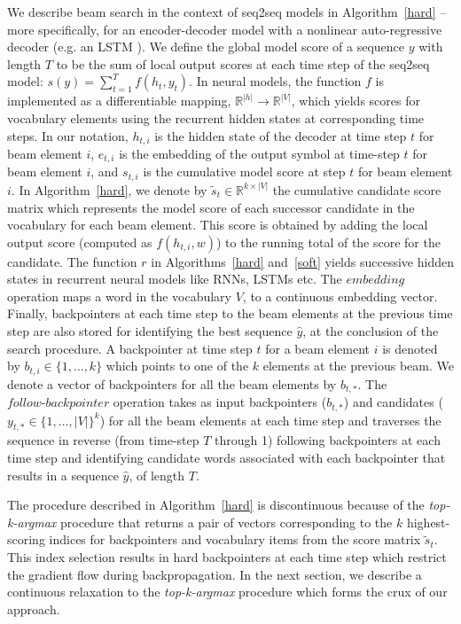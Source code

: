 \documentclass[letterpaper]{article} %
\begin{document}
We describe beam search in the context of seq2seq models in Algorithm~\ref{hard} -- more specifically, for an encoder-decoder \cite{sutskever2014sequence} model with a nonlinear auto-regressive decoder (e.g. an LSTM \cite{hochreiter1997long}). We define the global model score of a sequence $y$ with length $T$ to be the sum of local output scores at each time step of the seq2seq model: $s(y) = \sum_{t=1}^T f(h_t, y_t)$. In neural models, the function $f$ is implemented as a differentiable mapping, $\mathbb{R}^{|h|} \rightarrow \mathbb{R}^{|V|}$, which yields scores for vocabulary elements using the recurrent hidden states at corresponding time steps. In our notation, $h_{t,i}$ is the hidden state of the decoder at time step $t$ for beam element $i$, $e_{t,i}$ is the embedding of the output symbol at time-step $t$ for beam element $i$, and $s_{t,i}$ is the cumulative model score at step $t$ for beam element $i$. In Algorithm~\ref{hard}, we denote by $\tilde{s}_t \in \mathbb{R}^{k \times |V|}$ the cumulative candidate score matrix which represents the model score of each successor candidate in the vocabulary for each beam element. This score is obtained by adding the local output score (computed as $f(h_{t,i},w)$) to the running total of the score for the candidate. The function $r$ in Algorithms~\ref{hard} and~\ref{soft} yields successive hidden states in recurrent neural models like RNNs, LSTMs etc. The $\textit{embedding}$ operation maps a word in the vocabulary $V$, to a continuous embedding vector. Finally, backpointers at each time step to the beam elements at the previous time step are also stored for identifying the best sequence $\hat{y}$, at the conclusion of the search procedure. A backpointer at time step $t$ for a beam element $i$ is denoted by $\textit{b}_{t,i} \in \{1, \ldots, k\}$ which points to one of the $k$ elements at the previous beam. We denote a vector of backpointers for all the beam elements by $\textit{b}_{t,*}$. The $\textit{follow-backpointer}$ operation takes as input backpointers ($b_{t,*}$) and candidates ($y_{t,*} \in \{1, \ldots, |V|\}^k$) for all the beam elements at each time step and traverses the sequence in reverse (from time-step $T$ through 1) following backpointers at each time step and identifying candidate words associated with each backpointer that results in a sequence $\hat{y}$, of length $T$. 

The procedure described in Algorithm~\ref{hard} is discontinuous because of the \textit{top-k-argmax} procedure that returns a pair of vectors corresponding to the $k$ highest-scoring indices for backpointers and vocabulary items from the score matrix $\tilde s_t$. This index selection results in hard backpointers at each time step which restrict the gradient flow during backpropagation.
In the next section, we describe a continuous relaxation to the \textit{top-k-argmax} procedure which forms the crux of our approach.
\end{document}
